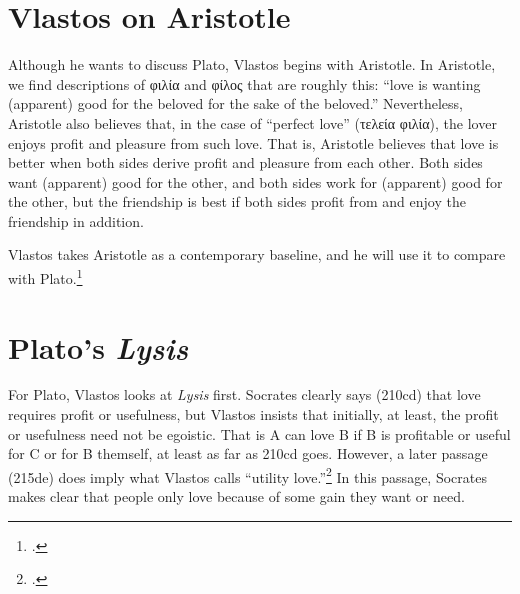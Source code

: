 \documentclass[12pt,letterpaper]{article}
\newcommand{\MONTH}{%
  \ifcase\the\month
  \or January%
  \or February%
  \or March%
  \or April%
  \or May%
  \or June%
  \or July%
  \or August%
  \or September%
  \or October%
  \or November%
  \or December%
  \fi}
\begin{document}

\pagestyle{notes}

\section*{Vlastos on Aristotle}

Although he wants to discuss Plato, Vlastos begins with Aristotle. In Aristotle, we find descriptions of \textgreek{φιλία} and \textgreek{φίλος} that are roughly this: ``love is wanting (apparent) good for the beloved for the sake of the beloved.'' Nevertheless, Aristotle also believes that, in the case of ``perfect love'' (\textgreek{τελεία φιλία}), the lover enjoys profit and pleasure from such love. That is, Aristotle believes that love is better when both sides derive profit and pleasure from each other. Both sides want (apparent) good for the other, and both sides work for (apparent) good for the other, but the friendship is best if both sides profit from and enjoy the friendship in addition.

Vlastos takes Aristotle as a contemporary baseline, and he will use it to compare with Plato.\footcite[][6]{vlastos-individual-object-love-plato-1969}

\section*{Plato's \textit{Lysis}}

For Plato, Vlastos looks at \textit{Lysis} first. Socrates clearly says (210cd) that love requires profit or usefulness, but Vlastos insists that initially, at least, the profit or usefulness need not be egoistic. That is A can love B if B is profitable or useful for C or for B themself, at least as far as 210cd goes. However, a later passage (215de) does imply what Vlastos calls ``utility love.''\footcite[][8]{vlastos-individual-object-love-plato-1969} In this passage, Socrates makes clear that people only love because of some gain they want or need.
\end{document}
